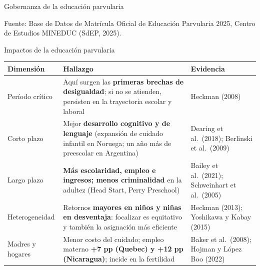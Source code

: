 \documentclass[aspectratio=169,10pt]{beamer}
\newcommand{\fuente}[1]{%
  \vfill{\color{graytext}\scriptsize Fuente: #1.}%
}
\newcommand{\destacar}[1]{\textcolor{steel}{\textbf{#1}}}
\begin{document}
\begin{frame}{Gobernanza de la educación parvularia}
\begin{center}
  \end{center}
  \fuente{Base de Datos de Matrícula Oficial de Educación Parvularia 2025, Centro de Estudios MINEDUC (SdEP, 2025)}
\end{frame}

\begin{frame}{Impactos de la educación parvularia}
  \renewcommand{\arraystretch}{1.5}
  \footnotesize
  \begin{center}
  \begin{tabular}{@{}>{\raggedright\arraybackslash}p{2.2cm}>{\raggedright\arraybackslash}p{6.9cm}>{\raggedright\arraybackslash}p{3.5cm}@{}}
    \textbf{Dimensión} & \textbf{Hallazgo} & \textbf{Evidencia} \\
    \hline
    Período crítico & Aquí surgen las \destacar{primeras brechas de desigualdad}; si no se atienden, persisten en la trayectoria escolar y laboral & Heckman (2008) \\
    Corto plazo & Mejor \destacar{desarrollo cognitivo y de lenguaje} (expansión de cuidado infantil en Noruega; un año más de preescolar en Argentina) & Dearing et al.\ (2018); Berlinski et al.\ (2009) \\
    Largo plazo & \destacar{Más escolaridad, empleo e ingresos; menos criminalidad} en la adultez (Head Start, Perry Preschool) & Bailey et al.\ (2021); Schweinhart et al.\ (2005) \\
    \rowcolor{steellight!25}
    Heterogeneidad & Retornos \destacar{mayores en niños y niñas en desventaja}: focalizar es equitativo y también la asignación más eficiente & Heckman (2013); Yoshikawa y Kabay (2015) \\
    Madres y hogares & Menor costo del cuidado; empleo materno \destacar{+7 pp (Quebec) y +12 pp (Nicaragua)}; incide en la fertilidad & Baker et al.\ (2008); Hojman y López Boo (2022) \\
  \end{tabular}
  \end{center}
\end{frame}
\end{document}
